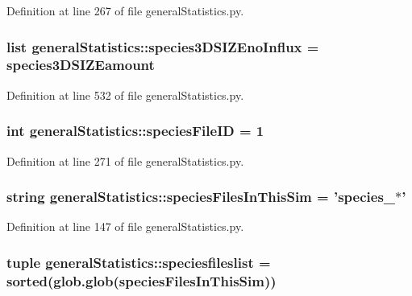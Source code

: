 \-Definition at line 267 of file general\-Statistics.\-py.

\hypertarget{namespacegeneral_statistics_a16af43c0053996886f2c1f6f0d99fae2}{
\subsubsection[{species3\-D\-S\-I\-Z\-Eno\-Influx}]{\setlength{\rightskip}{0pt plus 5cm}list {\bf general\-Statistics\-::species3\-D\-S\-I\-Z\-Eno\-Influx} = {\bf species3\-D\-S\-I\-Z\-Eamount}}}\label{namespacegeneral_statistics_a16af43c0053996886f2c1f6f0d99fae2}


\-Definition at line 532 of file general\-Statistics.\-py.

\hypertarget{namespacegeneral_statistics_a6b94bc4781eb4017a82145d7e6260e61}{
\subsubsection[{species\-File\-I\-D}]{\setlength{\rightskip}{0pt plus 5cm}int {\bf general\-Statistics\-::species\-File\-I\-D} = 1}}\label{namespacegeneral_statistics_a6b94bc4781eb4017a82145d7e6260e61}


\-Definition at line 271 of file general\-Statistics.\-py.

\hypertarget{namespacegeneral_statistics_abb8208696dc18d1afb27e8c01a0c0a58}{
\subsubsection[{species\-Files\-In\-This\-Sim}]{\setlength{\rightskip}{0pt plus 5cm}string {\bf general\-Statistics\-::species\-Files\-In\-This\-Sim} = 'species\-\_\-$\ast$'}}\label{namespacegeneral_statistics_abb8208696dc18d1afb27e8c01a0c0a58}


\-Definition at line 147 of file general\-Statistics.\-py.

\hypertarget{namespacegeneral_statistics_aa0ecc1dfa89ff9c9f241affd61ada255}{
\subsubsection[{speciesfileslist}]{\setlength{\rightskip}{0pt plus 5cm}tuple {\bf general\-Statistics\-::speciesfileslist} = sorted(glob.\-glob({\bf species\-Files\-In\-This\-Sim}))}}\label{namespacegeneral_statistics_aa0ecc1dfa89ff9c9f241affd61ada255}



